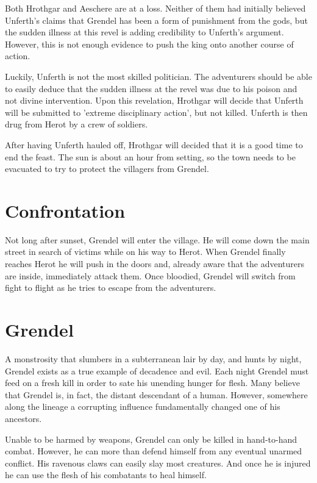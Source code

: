 \documentclass[10pt,twoside,twocolumn,openany]{book}
\begin{document}
Both Hrothgar and Aeschere are at a loss. Neither of them had initially believed Unferth's claims that Grendel has been a form of punishment from the gods, but the sudden illness at this revel is adding credibility to Unferth's argument. However, this is not enough evidence to push the king onto another course of action. 

Luckily, Unferth is not the most skilled politician. The adventurers should be able to easily deduce that the sudden illness at the revel was due to his poison and not divine intervention. Upon this revelation, Hrothgar will decide that Unferth will be submitted to 'extreme disciplinary action', but not killed. Unferth is then drug from Herot by a crew of soldiers.


After having Unferth hauled off, Hrothgar will decided that it is a good time to end the feast. The sun is about an hour from setting, so the town needs to be evacuated to try to protect the villagers from Grendel.

\section{Confrontation}

Not long after sunset, Grendel will enter the village. He will come down the main street in search of victims while on his way to Herot. When Grendel finally reaches Herot he will push in the doors and, already aware that the adventurers are inside, immediately attack them. Once bloodied, Grendel will switch from fight to flight as he tries to escape from the adventurers.

\clearpage

\section{\textbf{Grendel}}
A monstrosity that slumbers in a subterranean lair by day, and hunts by night, Grendel exists as a true example of decadence and evil. Each night Grendel must feed on a fresh kill in order to sate his unending hunger for flesh. Many believe that Grendel is, in fact, the distant descendant of a human. However, somewhere along the lineage a corrupting influence fundamentally changed one of his ancestors.

Unable to be harmed by weapons, Grendel can only be killed in hand-to-hand combat. However, he can more than defend himself from any eventual unarmed conflict. His ravenous claws can easily slay most creatures. And once he is injured he can use the flesh of his combatants to heal himself.
\end{document}
